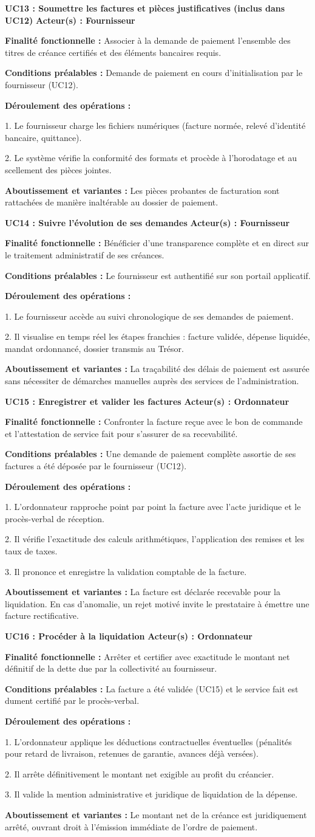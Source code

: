 \documentclass[11pt,a4paper]{article}
\newcommand{\ficheusecase}[6]{
  \vspace{0.45em}
  {\noindent\raggedright\textbf{\sffamily\normalsize\color{BleuInstitutionnel}#1} \hfill {\scriptsize\sffamily\bfseries\color{BleuSecondaire} Acteur(s) : #2}\par}
  \vspace{0.1em}
  {\small\textbf{Finalité fonctionnelle :} #3\par}
  {\small\textbf{Conditions préalables :} #4\par}
  {\small\textbf{Déroulement des opérations :}\par
  \vspace{0.05em}
  #5\par}
  \vspace{0.05em}
  {\small\color{BleuSecondaire}\textbf{Aboutissement et variantes :} #6\par}
  \vspace{0.35em}
}
\begin{document}
\ficheusecase{UC13 : Soumettre les factures et pièces justificatives (inclus dans UC12)}
{Fournisseur}
{Associer à la demande de paiement l'ensemble des titres de créance certifiés et des éléments bancaires requis.}
{Demande de paiement en cours d'initialisation par le fournisseur (UC12).}
{1. Le fournisseur charge les fichiers numériques (facture normée, relevé d'identité bancaire, quittance).\par
2. Le système vérifie la conformité des formats et procède à l'horodatage et au scellement des pièces jointes.}
{Les pièces probantes de facturation sont rattachées de manière inaltérable au dossier de paiement.}

\ficheusecase{UC14 : Suivre l'évolution de ses demandes}
{Fournisseur}
{Bénéficier d'une transparence complète et en direct sur le traitement administratif de ses créances.}
{Le fournisseur est authentifié sur son portail applicatif.}
{1. Le fournisseur accède au suivi chronologique de ses demandes de paiement.\par
2. Il visualise en temps réel les étapes franchies : facture validée, dépense liquidée, mandat ordonnancé, dossier transmis au Trésor.}
{La traçabilité des délais de paiement est assurée sans nécessiter de démarches manuelles auprès des services de l'administration.}

\ficheusecase{UC15 : Enregistrer et valider les factures}
{Ordonnateur}
{Confronter la facture reçue avec le bon de commande et l'attestation de service fait pour s'assurer de sa recevabilité.}
{Une demande de paiement complète assortie de ses factures a été déposée par le fournisseur (UC12).}
{1. L'ordonnateur rapproche point par point la facture avec l'acte juridique et le procès-verbal de réception.\par
2. Il vérifie l'exactitude des calculs arithmétiques, l'application des remises et les taux de taxes.\par
3. Il prononce et enregistre la validation comptable de la facture.}
{La facture est déclarée recevable pour la liquidation. En cas d'anomalie, un rejet motivé invite le prestataire à émettre une facture rectificative.}

\ficheusecase{UC16 : Procéder à la liquidation}
{Ordonnateur}
{Arrêter et certifier avec exactitude le montant net définitif de la dette due par la collectivité au fournisseur.}
{La facture a été validée (UC15) et le service fait est dument certifié par le procès-verbal.}
{1. L'ordonnateur applique les déductions contractuelles éventuelles (pénalités pour retard de livraison, retenues de garantie, avances déjà versées).\par
2. Il arrête définitivement le montant net exigible au profit du créancier.\par
3. Il valide la mention administrative et juridique de liquidation de la dépense.}
{Le montant net de la créance est juridiquement arrêté, ouvrant droit à l'émission immédiate de l'ordre de paiement.}
\end{document}
